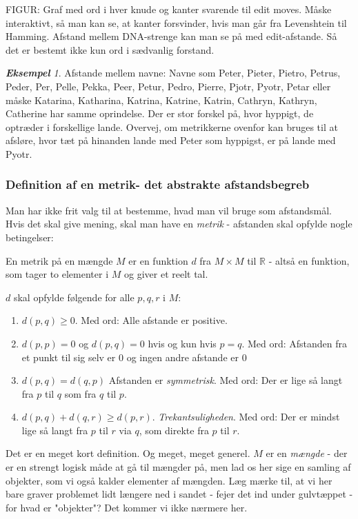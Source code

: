 \documentclass[a4paper, 12pt]{article}
\theoremstyle{remark}
\newtheorem{Eksempel}{\textbf{Eksempel}}
\begin{document}
FIGUR: Graf med ord i hver knude og kanter svarende til edit moves. Måske interaktivt, så man kan se, at kanter forsvinder, hvis man går fra Levenshtein til Hamming. 
Afstand mellem DNA-strenge kan man se på med edit-afstande. Så det er bestemt ikke kun ord i sædvanlig forstand. 

\begin{Eksempel}
Afstande mellem navne: Navne som Peter, Pieter, Pietro, Petrus, Peder, Per, Pelle, Pekka, Peer, Petur, Pedro, Pierre, Pjotr, Pyotr, Petar eller måske Katarina, Katharina, Katrina, Katrine, Katrin, Cathryn, Kathryn, Catherine har samme oprindelse. Der er stor forskel på, hvor hyppigt, de optræder i forskellige lande. Overvej, om metrikkerne ovenfor kan bruges til at afsløre, hvor tæt på hinanden lande med Peter som hyppigst, er på lande med Pyotr. 


\end{Eksempel}
\subsubsection*{Definition af en metrik- det abstrakte afstandsbegreb}

Man har ikke frit valg til at bestemme, hvad man vil bruge som afstandsmål. Hvis det skal give mening, skal man have en \emph{metrik} - afstanden skal opfylde nogle betingelser: 
\begin{tcolorbox}[title=Metrik]
En metrik på en mængde $M$ er en funktion $d$ fra $M\times M$  til $\mathbb{R}$ - altså en funktion, som tager to elementer  i $M$ og giver et reelt tal.

$d$ skal opfylde følgende for alle $p,q,r$ i $M$:
\begin{enumerate}
\item $d(p,q)\geq 0$. Med ord: Alle afstande er positive.
\item $d(p,p)=0$ og $d(p,q)=0$ hvis og kun hvis $p=q$.  Med ord: Afstanden fra et punkt til sig selv er $0$ og ingen andre afstande er $0$
\item $d(p,q)=d(q,p)$ Afstanden er \emph{symmetrisk}. Med ord: Der er lige så langt fra $p$ til $q$ som fra $q$ til $p$.
\item $d(p,q)+d(q,r)\geq d(p,r)$. \emph{Trekantsuligheden}. Med ord:  Der er mindst lige så langt fra $p$ til $ r$ via $q$, som direkte fra $p$ til $r$. 
\end{enumerate}
\end{tcolorbox}

Det er en meget kort definition. Og meget, meget generel. $M$ er en \emph{mængde} - der er en strengt logisk måde at gå til mængder på, men lad os her sige en samling af objekter, som vi også kalder elementer af mængden. Læg mærke til, at vi her bare graver problemet lidt længere ned i sandet - fejer det ind under gulvtæppet - for hvad er "objekter"?  Det kommer vi ikke nærmere her. 
\end{document}
